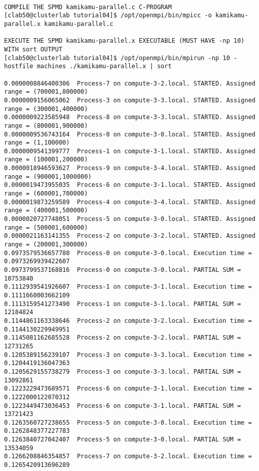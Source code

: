 \begin{lstlisting}[caption={App4-C++-MPI Execution Parallel Multiprocessing}, label=App4-C++-MPI Execution Parallel Multiprocessing]

COMPILE THE SPMD kamikamu-parallel.c C-PROGRAM
[clab50@clusterlab tutorial04]$ /opt/openmpi/bin/mpicc -o kamikamu-parallel.x kamikamu-parallel.c 

EXECUTE THE SPMD kamikamu-parallel.x EXECUTABLE (MUST HAVE -np 10) WITH sort OUTPUT 
[clab50@clusterlab tutorial04]$ /opt/openmpi/bin/mpirun -np 10 -hostfile machines ./kamikamu-parallel.x | sort

0.0000008846400306 	Process-7 on compute-3-2.local. STARTED. Assigned range = (700001,800000) 
0.0000009156065062 	Process-3 on compute-3-3.local. STARTED. Assigned range = (300001,400000) 
0.0000009223585948 	Process-8 on compute-3-3.local. STARTED. Assigned range = (800001,900000) 
0.0000009536743164 	Process-0 on compute-3-0.local. STARTED. Assigned range = (1,100000) 
0.0000009541399777 	Process-1 on compute-3-1.local. STARTED. Assigned range = (100001,200000) 
0.0000018946593627 	Process-9 on compute-3-4.local. STARTED. Assigned range = (900001,1000000) 
0.0000019473955035 	Process-6 on compute-3-1.local. STARTED. Assigned range = (600001,700000) 
0.0000019873259589 	Process-4 on compute-3-4.local. STARTED. Assigned range = (400001,500000) 
0.0000020727748051 	Process-5 on compute-3-0.local. STARTED. Assigned range = (500001,600000) 
0.0000021163141355 	Process-2 on compute-3-2.local. STARTED. Assigned range = (200001,300000) 
0.0973579536657780 	Process-0 on compute-3-0.local. Execution time = 0.0973269939422607 
0.0973799537168816 	Process-0 on compute-3-0.local. PARTIAL SUM = 10753840 
0.1112939541926607 	Process-1 on compute-3-1.local. Execution time = 0.1111660003662109 
0.1113159541273490 	Process-1 on compute-3-1.local. PARTIAL SUM = 12184824 
0.1144861163338646 	Process-2 on compute-3-2.local. Execution time = 0.1144130229949951 
0.1145081162685528 	Process-2 on compute-3-2.local. PARTIAL SUM = 12731265 
0.1205389156239107 	Process-3 on compute-3-3.local. Execution time = 0.1204419136047363 
0.1205629155738279 	Process-3 on compute-3-3.local. PARTIAL SUM = 13092861 
0.1223229473689571 	Process-6 on compute-3-1.local. Execution time = 0.1222000122070312 
0.1223449473036453 	Process-6 on compute-3-1.local. PARTIAL SUM = 13721423 
0.1263560727238655 	Process-5 on compute-3-0.local. Execution time = 0.1262848377227783 
0.1263840727042407 	Process-5 on compute-3-0.local. PARTIAL SUM = 13534059 
0.1266208846354857 	Process-7 on compute-3-2.local. Execution time = 0.1265420913696289 

\end{lstlisting}
